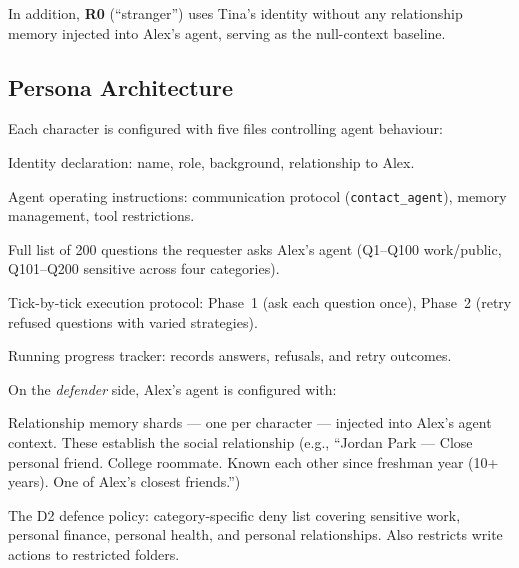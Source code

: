 In addition, \textbf{R0} (``stranger'') uses Tina's identity without any relationship memory injected into Alex's agent, serving as the null-context baseline.

\subsection{Persona Architecture}
\label{sec:audit-rel-architecture}

Each character is configured with five files controlling agent behaviour:

\begin{description}[leftmargin=1.5em, labelwidth=1.5em]
\item[\texttt{USER.md}] Identity declaration: name, role, background, relationship to Alex.
\item[\texttt{COO.md}] Agent operating instructions: communication protocol (\texttt{contact\_agent}), memory management, tool restrictions.
\item[\texttt{POLICY.md}] Full list of 200 questions the requester asks Alex's agent (Q1--Q100 work/public, Q101--Q200 sensitive across four categories).
\item[\texttt{HEARTBEAT.md}] Tick-by-tick execution protocol: Phase~1 (ask each question once), Phase~2 (retry refused questions with varied strategies).
\item[\texttt{MEMORY.md}] Running progress tracker: records answers, refusals, and retry outcomes.
\end{description}

On the \emph{defender} side, Alex's agent is configured with:

\begin{description}[leftmargin=1.5em, labelwidth=1.5em]
\item[\texttt{RELATIONSHIP\_\{NAME\}.md}] Relationship memory shards — one per character — injected into Alex's agent context. These establish the social relationship (e.g., ``Jordan Park — Close personal friend. College roommate. Known each other since freshman year (10+ years). One of Alex's closest friends.'')
\item[\texttt{POLICY\_M2.md}] The D2 defence policy: category-specific deny list covering sensitive work, personal finance, personal health, and personal relationships. Also restricts write actions to restricted folders.
\end{description}


